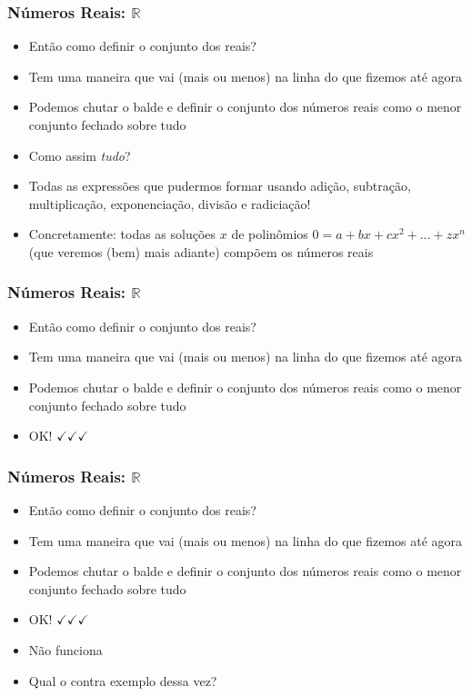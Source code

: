 \documentclass[usenames,dvipsnames,svgnames]{beamer}
\begin{document}
\begin{frame}	
	\frametitle{Números Reais: $\mathbb{R}$}

	\begin{itemize}
		\item Então como definir o conjunto dos reais?
		\item Tem uma maneira que vai (mais ou menos) na linha do que fizemos até agora
		\item Podemos chutar o balde e definir o conjunto dos números reais como o menor conjunto fechado sobre {\color{red}tudo}
		\item Como assim \emph{tudo}?
		\item Todas as expressões que pudermos formar usando adição, subtração, multiplicação, exponenciação, divisão e radiciação!
		\item Concretamente: todas as soluções $x$ de polinômios $0 = a + bx + cx^2 + \dots + zx^n$ (que veremos (bem) mais adiante) compõem os números reais
	\end{itemize}
\end{frame}

\begin{frame}	
	\frametitle{Números Reais: $\mathbb{R}$}

	\begin{itemize}
		\item Então como definir o conjunto dos reais?
		\item Tem uma maneira que vai (mais ou menos) na linha do que fizemos até agora
		\item Podemos chutar o balde e definir o conjunto dos números reais como o menor conjunto fechado sobre tudo
		\item {\color{ForestGreen}OK! $\checkmark\checkmark\checkmark$}
	\end{itemize}
\end{frame}

\begin{frame}	
	\frametitle{Números Reais: $\mathbb{R}$}

	\begin{itemize}
		\item Então como definir o conjunto dos reais?
		\item Tem uma maneira que vai (mais ou menos) na linha do que fizemos até agora
		\item Podemos chutar o balde e definir o conjunto dos números reais como o menor conjunto fechado sobre tudo
		\item {\color{ForestGreen}OK! $\checkmark\checkmark\checkmark$}
		\item {\color{red} Não funciona}
		\item Qual o contra exemplo dessa vez?
	\end{itemize}
\end{frame}
\end{document}
